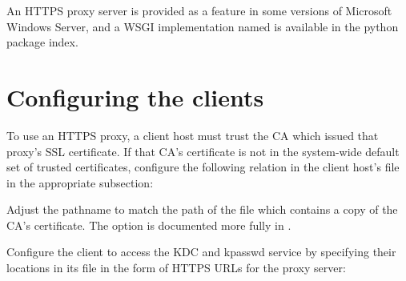 \documentclass[letterpaper,10pt,english]{sphinxmanual}
\begin{document}
An HTTPS proxy server is provided as a feature in some versions of
Microsoft Windows Server, and a WSGI implementation named 
is available in the python package index.


\section{Configuring the clients}
\label{\detokenize{admin/https:configuring-the-clients}}
To use an HTTPS proxy, a client host must trust the CA which issued
that proxy’s SSL certificate.  If that CA’s certificate is not in the
system-wide default set of trusted certificates, configure the
following relation in the client host’s {\hyperref[\detokenize{admin/conf_files/krb5_conf:krb5-conf-5}]{}} file in
the appropriate {\hyperref[\detokenize{admin/conf_files/krb5_conf:realms}]{}} subsection:

%
\begin{sphinxVerbatim}[commandchars=\\\{\}]
  
\end{sphinxVerbatim}

Adjust the pathname to match the path of the file which contains a
copy of the CA’s certificate.  The  option is documented
more fully in {\hyperref[\detokenize{admin/conf_files/krb5_conf:krb5-conf-5}]{}}.

Configure the client to access the KDC and kpasswd service by
specifying their locations in its {\hyperref[\detokenize{admin/conf_files/krb5_conf:krb5-conf-5}]{}} file in the form
of HTTPS URLs for the proxy server:

%
\begin{sphinxVerbatim}[commandchars=\\\{\}]
  
  
\end{sphinxVerbatim}
\end{document}
